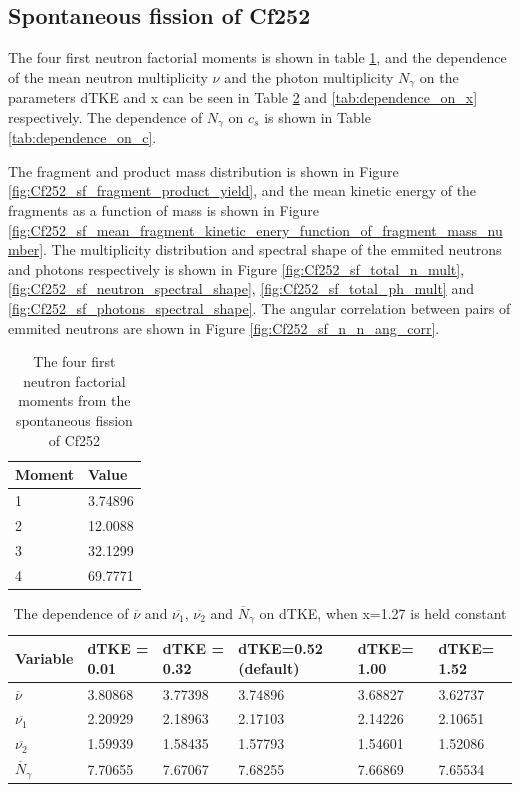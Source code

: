 \documentclass[]{article}
\begin{document}
\subsection{Spontaneous fission of Cf252 }

The four first neutron factorial moments is shown in table \ref{tab:Cf252_n_moments}, and the dependence of the mean neutron multiplicity $\nu$ and the photon multiplicity $N_{\gamma}$ on the parameters dTKE and x  can be seen in Table \ref{tab:dependence_on_dTKE} and \ref{tab:dependence_on_x} respectively. The dependence of $N_{\gamma}$ on $c_s$ is shown in Table \ref{tab:dependence_on_c}.

The fragment and product mass distribution is shown in Figure \ref{fig:Cf252_sf_fragment_product_yield}, and the mean kinetic energy of the fragments as a function of mass is shown in Figure \ref{fig:Cf252_sf_mean_fragment_kinetic_enery_function_of_fragment_mass_number}. The multiplicity distribution and spectral shape of the emmited neutrons and photons respectively is shown in Figure \ref{fig:Cf252_sf_total_n_mult}, \ref{fig:Cf252_sf_neutron_spectral_shape}, \ref{fig:Cf252_sf_total_ph_mult} and \ref{fig:Cf252_sf_photons_spectral_shape}. The angular correlation between pairs of emmited neutrons are shown in Figure \ref{fig:Cf252_sf_n_n_ang_corr}.


\begin{table} [H]
	\centering
	\caption{The four first neutron factorial moments from the spontaneous fission of Cf252}
	\begin{tabularx}{\textwidth}{XX} \hline
		\label{tab:Cf252_n_moments}
		Moment & Value \\ \hline
		1 & 3.74896 \\
		2 & 12.0088\\
		3 & 32.1299\\
		4 & 69.7771\\ 
	\end{tabularx}
\end{table}

\begin{table} [H]
	\centering
	\caption{The dependence of $\overline{\nu}$  and $\overline{\nu_1}$, $\overline{\nu_2}$ and $\overline{N}_{\gamma}$ on dTKE, when x=1.27 is held constant}
	\begin{tabularx}{\textwidth}{XXXXXX} \hline
		\label{tab:dependence_on_dTKE}
		Variable & dTKE = 0.01&dTKE = 0.32 &dTKE=0.52 (default) & dTKE= 1.00 & dTKE= 1.52\\ \hline
		$\overline{\nu}$ & 3.80868 & 3.77398 & 3.74896 & 3.68827 & 3.62737\\
		$\overline{\nu_1}$ & 2.20929 & 2.18963  & 2.17103& 2.14226 & 2.10651 \\
		$\overline{\nu_2}$ & 1.59939 &1.58435 & 1.57793 & 1.54601 &  1.52086\\ 
		$\overline{N}_{\gamma}$ & 7.70655 & 7.67067 & 7.68255 & 7.66869 & 7.65534\\
		\hline
	\end{tabularx}
\end{table}
\end{document}
